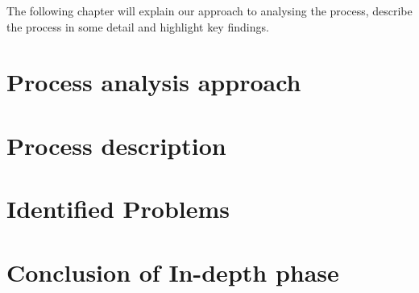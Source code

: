 The following chapter will explain our approach to analysing the process, describe the process in some detail and highlight key findings.

\section{Process analysis approach}

\section{Process description}

\section{Identified Problems}
\section{Conclusion of In-depth phase}
